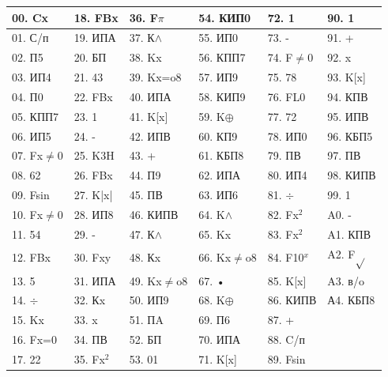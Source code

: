 \documentclass[11pt,a4paper,oneside]{article}
\begin{document}
\begin{table}[]
\begin{tabular}{|l|l|l|l|l|l|}
\hline
00. Cx   & 18. FBx  & 36. F$\pi$ & 54. КИП0  & 72. 1        & 90. 1    \\ \hline
01. С/п  & 19. ИПА  & 37. К$\wedge$     & 55. ИП0   & 73. -        & 91. +    \\ \hline
02. П5   & 20. БП   & 38. K{x}   & 56. КПП7  & 74. F$\neq$0 & 92. x    \\ \hline
03. ИП4  & 21. 43   & 39. Kx=o8  & 57. ИП9   & 75. 78       & 93. K[x] \\ \hline
04. П0   & 22. FBx  & 40. ИПА    & 58. КИП9  & 76. FL0      & 94. КПВ  \\ \hline
05. КПП7 & 23. 1    & 41. K[x]   & 59. K$\oplus$    & 77. 72       & 95. ИПВ  \\ \hline
06. ИП5  & 24. -    & 42. ИПВ    & 60. КП9   & 78. ИП0      & 96. КБП5 \\ \hline
07. Fx$\neq$0 & 25. K3H  & 43. +      & 61. КБП8  & 79. ПВ       & 97. ПВ   \\ \hline
08. 62   & 26. FBx  & 44. П9     & 62. ИПА   & 80. ИП4      & 98. КИПВ \\ \hline
09. Fsin & 27. K|x| & 45. ПВ     & 63. ИП6   & 81. $\div$        & 99. 1    \\ \hline
10. Fx$\neq$0 & 28. ИП8  & 46. КИПВ   & 64. K$\wedge$    & 82. Fx$^{2}$      & A0. -    \\ \hline
11. 54   & 29. -    & 47. К$\wedge$     & 65. K{x}  & 83. Fx$^{2}$      & A1. КПВ  \\ \hline
12. FBx  & 30. Fxy  & 48. К{x}   & 66. Kx$\neq$o8 & 84. F10$^{x}$     & A2. F$\sqrt{}$   \\ \hline
13. 5    & 31. ИПА  & 49. Kx$\neq$o8  & 67. •     & 85. K[x]     & A3. в/o  \\ \hline
14. $\div$    & 32. К{x} & 50. ИП9    & 68. K$\oplus$    & 86. КИПВ     & А4. КБП8 \\ \hline
15. K{x} & 33. x    & 51. ПA     & 69. П6    & 87. +        &          \\ \hline
16. Fx=0 & 34. ПВ   & 52. БП     & 70. ИПА   & 88. C/п      &          \\ \hline
17. 22   & 35. Fx$^{2}$  & 53. 01     & 71. K[x]  & 89. Fsin     &          \\ \hline
\end{tabular}
\end{table}
\end{document}
